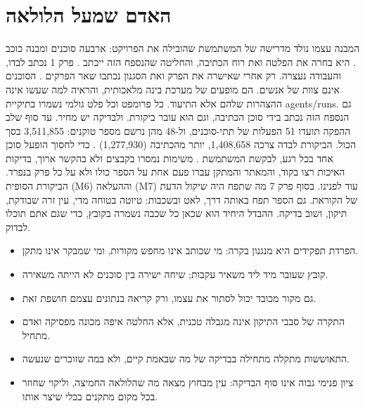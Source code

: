 \section{האדם שמעל הלולאה}
המבנה עצמו נולד מדרישה של המשתמשת שהובילה את הפרויקט: ארבעה סוכנים ומבנה כוכב . היא בחרה את הפלטה ואת רוח הכתיבה, והחליטה שהנספח הזה ייכתב . פרק 1 נכתב לבדו, והעבודה נעצרה. רק אחרי שאישרה את הפרק ואת הסגנון נכתבו שאר הפרקים .
הסוכנים אינם צוות של אנשים. הם מופעים של מערכת בינה מלאכותית, והראיה למה שעשו אינה ההצהרות שלהם אלא התיעוד. כל פרומפט וכל פלט גולמי נשמרו בתיקיית agents/runs. גם הנספח הזה נכתב בידי סוכן הכתיבה, וגם הוא עובר ביקורת.
ולבדיקה יש מחיר. עד סוף שלב ההפקה תועדו 51 הפעלות של תתי-סוכנים, ול-48 מהן נרשם מספר טוקנים: 3,511,855 בסך הכול. הביקורת לבדה צרכה 1,408,658, יותר מהכתיבה (1,277,930) . כדי לחסוך הופעל סוכן אחד בכל רגע, לבקשת המשתמשת . משימות נמסרו בקבצים ולא בהקשר ארוך, בדיקות האיכות רצו בקוד, והמאתר והמתקן עברו פעם אחת על הספר כולו ולא על כל פרק בנפרד. הביקורת הסופית (M6) וההעלאה (M7) עוד לפנינו.
בסוף פרק 7 מה שתפח היה שיקול הדעת של הקוראת. גם הספר תפח באותה דרך, לאט ובשכבות: טיוטה בטוחה מדי, עין זרה שבודקת, תיקון, ושוב בדיקה. ההבדל היחיד הוא שכאן כל שכבה נשמרה בקובץ, כדי שגם אתם תוכלו לבדוק.
\begin{insightsbox}
\begin{itemize}
\item הפרדת תפקידים היא מנגנון בקרה: מי שכותב אינו מחפש מקורות, ומי שמבקר אינו מתקן.
\item קובץ שעובר מיד ליד משאיר עקבות; שיחה ישירה בין סוכנים לא הייתה משאירה.
\item גם מקור מכובד יכול לסתור את עצמו, ורק קריאה בנתונים עצמם חושפת זאת.
\item התקרה של סבבי התיקון אינה מגבלה טכנית, אלא החלטה איפה מכונה מפסיקה ואדם מתחיל.
\item התאוששות מתקלה מתחילה בבדיקה של מה שבאמת קיים, ולא במה שזוכרים שנעשה.
\item ציון פנימי גבוה אינו סוף הבדיקה: עין מבחוץ מצאה מה שהלולאה החמיצה, וליקוי שחוזר בכל מקום מתקנים בכלי שיצר אותו.
\end{itemize}
\end{insightsbox}

